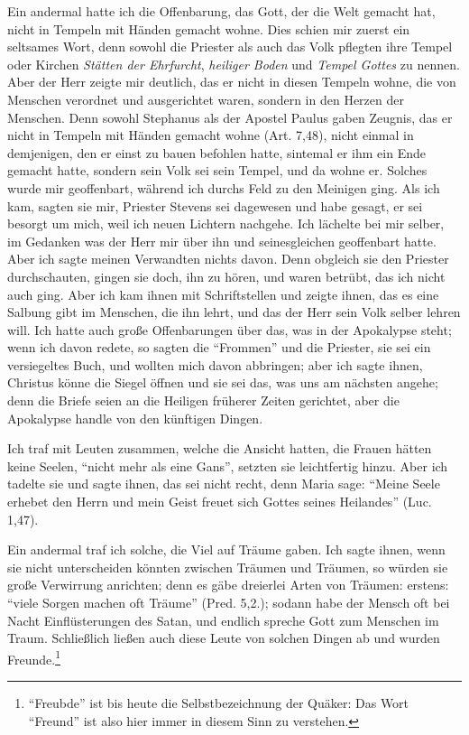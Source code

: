 Ein andermal hatte ich die Offenbarung, das Gott, der die
Welt gemacht hat, nicht in Tempeln mit Händen gemacht wohne.
Dies schien mir zuerst ein seltsames Wort, denn sowohl die
Priester als auch das Volk pflegten ihre Tempel oder Kirchen
\textit{Stätten der Ehrfurcht}, \textit{heiliger Boden} und \textit{Tempel Gottes}
zu nennen. Aber der Herr zeigte mir deutlich, das er nicht
in diesen Tempeln wohne, die von Menschen verordnet und
ausgerichtet waren, sondern in den Herzen der Menschen. Denn
sowohl Stephanus als der Apostel Paulus gaben Zeugnis,
das er nicht in Tempeln mit Händen gemacht wohne (Art. 7,48),
nicht einmal in demjenigen, den er einst zu bauen befohlen hatte,
sintemal er ihm ein Ende gemacht hatte, sondern sein Volk sei
sein Tempel, und da wohne er. Solches wurde mir geoffenbart,
während ich durchs Feld zu den Meinigen ging. Als ich kam,
sagten sie mir, Priester Stevens sei dagewesen und habe gesagt,
er sei besorgt um mich, weil ich neuen Lichtern nachgehe. Ich
lächelte bei mir selber, im Gedanken was der Herr mir über ihn
und seinesgleichen geoffenbart hatte. Aber ich sagte meinen 
Verwandten nichts davon. Denn obgleich sie den Priester durchschauten, 
gingen sie doch, ihn zu hören, und waren betrübt, das
ich nicht auch ging. Aber ich kam ihnen mit Schriftstellen und
zeigte ihnen, das es eine Salbung gibt im Menschen, die ihn
lehrt, und das der Herr sein Volk selber lehren will. Ich hatte
auch große Offenbarungen über das, was in der Apokalypse steht;
wenn ich davon redete, so sagten die "`Frommen"' und die Priester,
sie sei ein versiegeltes Buch, und wollten mich davon abbringen;
aber ich sagte ihnen, Christus könne die Siegel öffnen und sie
sei das, was uns am nächsten angehe; denn die Briefe seien an
die Heiligen früherer Zeiten gerichtet, aber die Apokalypse handle
von den künftigen Dingen.

Ich traf mit Leuten zusammen, welche die Ansicht hatten,
die Frauen hätten keine Seelen, "`nicht mehr als eine Gans"',
setzten sie leichtfertig hinzu. Aber ich tadelte sie und sagte ihnen,
das sei nicht recht, denn Maria sage: "`Meine Seele erhebet den
Herrn und mein Geist freuet sich Gottes seines Heilandes"' (Luc. 1,47).

Ein andermal traf ich solche, die Viel auf Träume gaben.
Ich sagte ihnen, wenn sie nicht unterscheiden könnten zwischen
Träumen und Träumen, so würden sie große Verwirrung anrichten; 
denn es gäbe dreierlei Arten von Träumen: erstens:
"`viele Sorgen machen oft Träume"' (Pred. 5,2.); sodann habe der
Mensch oft bei Nacht Einflüsterungen des Satan, und endlich
spreche Gott zum Menschen im Traum. Schließlich ließen auch
diese Leute von solchen Dingen ab und wurden Freunde.\footnote{"`Freubde"' 
ist bis heute die Selbstbezeichnung der Quäker: Das Wort
"`Freund"' ist also hier immer in diesem Sinn zu verstehen.}

